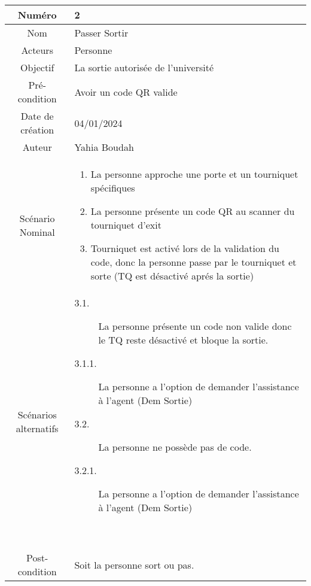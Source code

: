 
\begin{tabular}{ |c|p{12cm}| }
    \hline
    Numéro & 2 \\
    \hline
    Nom & Passer Sortir \\
    \hline
    Acteurs & Personne \\ 
    \hline
    Objectif & La sortie autorisée de l'université \\ 
    \hline
    Pré-condition & Avoir un code QR valide \\
    \hline
    Date de création & 04/01/2024 \\
    \hline
    Auteur & Yahia Boudah \\
    \hline
    Scénario Nominal & \begin{enumerate}
        \item La personne approche une porte et un tourniquet spécifiques
        \item La personne présente un code QR au scanner du tourniquet d'exit
        \item Tourniquet est activé lors de la validation du code, donc la personne passe par le tourniquet et sorte (TQ est désactivé aprés la sortie)
    \end{enumerate} \\
    \hline
    Scénarios alternatifs & \begin{description}
        \item[3.1.] La personne présente un code non valide
        donc le TQ reste désactivé et bloque la sortie.
        \item[3.1.1.] La personne a l'option de demander l'assistance à l'agent (Dem Sortie)
        \item[3.2.] La personne ne possède pas de code.
        \item[3.2.1.]  La personne a l'option de demander l'assistance à l'agent (Dem Sortie)
    \end{description} \\
    \hline
    Post-condition & Soit la personne sort ou pas. \\
    \hline
\end{tabular}